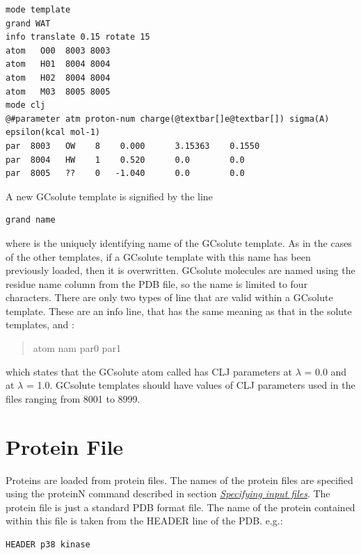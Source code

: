 \documentclass[letterpaper,10pt,english]{manual}
\begin{document}
\begin{Verbatim}[commandchars=@\[\]]
mode template
grand WAT
info translate 0.15 rotate 15
atom   O00  8003 8003
atom   H01  8004 8004
atom   H02  8004 8004
atom   M03  8005 8005
mode clj
@#parameter atm proton-num charge(@textbar[]e@textbar[]) sigma(A) epsilon(kcal mol-1)
par  8003   OW    8    0.000      3.15363    0.1550
par  8004   HW    1    0.520      0.0        0.0
par  8005   ??    0   -1.040      0.0        0.0
\end{Verbatim}

A new GCsolute template is signified by the line

\begin{Verbatim}[commandchars=@\[\]]
grand name
\end{Verbatim}

where  is the uniquely identifying name of the GCsolute template. As in the cases of the other templates, if a GCsolute template with this name has been previously loaded, then it is overwritten. GCsolute molecules are named using the residue name column from the PDB file, so the name is limited to four characters. There are only two types of line that are valid within a GCsolute template. These are an info line, that has the same meaning as that in the solute templates, and :
\begin{quote}

atom nam par0 par1
\end{quote}

which states that the GCsolute atom called  has CLJ parameters  at $\lambda$  = 0.0 and  at $\lambda$ = 1.0. GCsolute templates should have values of CLJ parameters used in the files ranging from 8001 to 8999.
\hypertarget{protpdb}{}

\section{Protein File}

Proteins are loaded from protein files. The names of the protein files are specified using the proteinN command described in section \hyperlink{incmd}{\emph{Specifying input files}}. The protein file is just a standard PDB format file. The name of the protein contained within this file is taken from the HEADER line of the PDB. e.g.:

\begin{Verbatim}[commandchars=@\[\]]
HEADER p38 kinase
\end{Verbatim}
\end{document}
